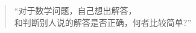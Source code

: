 
\begin{frame}
  \begin{columns}
  \end{columns}

  \pause
  \vspace{0.60cm}
  \begin{quote}
	\centering
	{\large ``对于数学问题，自己想出解答，\\ 和判断别人说的解答是否正确，何者比较简单?''}
  \end{quote}
\end{frame}

\begin{frame}
\end{frame}

